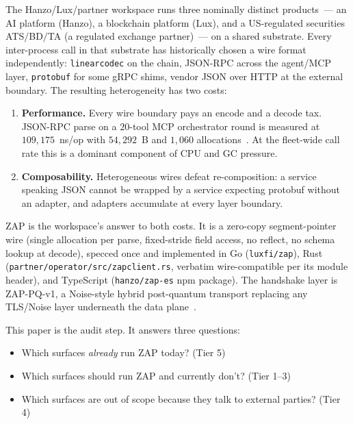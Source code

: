\documentclass[11pt,a4paper]{article}
\begin{document}
The Hanzo/Lux/partner workspace runs three nominally distinct
products~--- an AI platform (Hanzo), a blockchain platform (Lux), and
a US-regulated securities ATS$/$BD$/$TA (a regulated exchange partner)~--- on a shared
substrate. Every inter-process call in that substrate has historically
chosen a wire format independently: \texttt{linearcodec} on the chain,
JSON-RPC across the agent/MCP layer, \texttt{protobuf} for some gRPC
shims, vendor JSON over HTTP at the external boundary. The resulting
heterogeneity has two costs:

\begin{enumerate}[leftmargin=*]
  \item \textbf{Performance.} Every wire boundary pays an encode and a
    decode tax. JSON-RPC parse on a $20$-tool MCP orchestrator round
    is measured at $109{,}175$~ns/op with $54{,}292$~B and $1{,}060$
    allocations~\cite{zapreadme}. At the fleet-wide call rate this is
    a dominant component of CPU and GC pressure.
  \item \textbf{Composability.} Heterogeneous wires defeat
    re-composition: a service speaking JSON cannot be wrapped by a
    service expecting protobuf without an adapter, and adapters
    accumulate at every layer boundary.
\end{enumerate}

ZAP is the workspace's answer to both costs. It is a zero-copy
segment-pointer wire (single allocation per parse, fixed-stride field
access, no reflect, no schema lookup at decode), specced once and
implemented in Go (\texttt{luxfi/zap}), Rust
(\texttt{partner/operator/src/zapclient.rs}, verbatim wire-compatible
per its module header), and TypeScript
(\texttt{hanzo/zap-es} npm package). The handshake layer is ZAP-PQ-v1,
a Noise-style hybrid post-quantum transport replacing any TLS/Noise
layer underneath the data plane~\cite{zappqspec}.

This paper is the audit step. It answers three questions:

\begin{itemize}[leftmargin=*]
  \item Which surfaces \emph{already} run ZAP today? (Tier 5)
  \item Which surfaces should run ZAP and currently don't? (Tier 1--3)
  \item Which surfaces are out of scope because they talk to external
        parties? (Tier 4)
\end{itemize}








\end{document}
